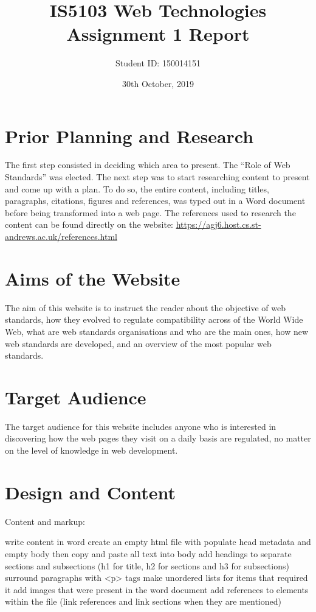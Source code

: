 \documentclass[letterpaper,12pt]{article}
\begin{document}
\title{IS5103 Web Technologies\\Assignment 1 Report}
\author{Student ID: 150014151}
\date{30th October, 2019}
\maketitle
\newpage

\tableofcontents
\newpage

\section{Prior Planning and Research}

The first step consisted in deciding which area to present. The ``Role of Web Standards'' was elected. The next step was to start researching content to present and come up with a plan. To do so, the entire content, including titles, paragraphs, citations, figures and references, was typed out in a Word document before being transformed into a web page. The references used to research the content can be found directly on the website: \url{https://agj6.host.cs.st-andrews.ac.uk/references.html}

\section{Aims of the Website}

The aim of this website is to instruct the reader about the objective of web standards, how they evolved to regulate compatibility across of the World Wide Web, what are web standards organisations and who are the main ones, how new web standards are developed, and an overview of the most popular web standards.

\section{Target Audience}

The target audience for this website includes anyone who is interested in discovering how the web pages they visit on a daily basis are regulated, no matter on the level of knowledge in web development.

\section{Design and Content}

Content and markup:

write content in word
create an empty html file with populate head metadata and empty body
then copy and paste all text into body
add headings to separate sections and subsections (h1 for title, h2 for sections and h3 for subsections)
surround paragraphs with <p> tags
make unordered lists for items that required it
add images that were present in the word document
add references to elements within the file (link references and link sections when they are mentioned) 
\end{document}
